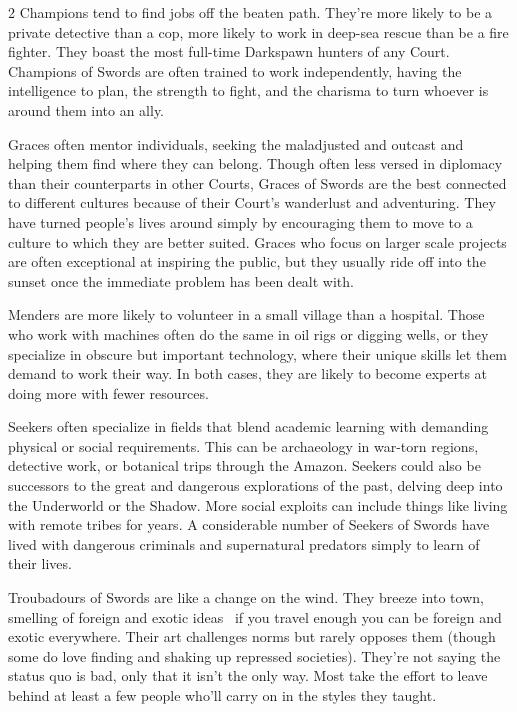 \begin{multicols}{2}
Champions tend to find jobs off the beaten path. They're more likely to be a private detective than a cop, more likely to work in deep-sea rescue than be a fire fighter. They boast the most full-time Darkspawn hunters of any Court. Champions of Swords are often trained to work independently, having the intelligence to plan, the strength to fight, and the charisma to turn whoever is around them into an ally.

Graces often mentor individuals, seeking the maladjusted and outcast and helping them find where they can belong. Though often less versed in diplomacy than their counterparts in other Courts, Graces of Swords are the best connected to different cultures because of their Court's wanderlust and adventuring. They have turned people's lives around simply by encouraging them to move to a culture to which they are better suited. Graces who focus on larger scale projects are often exceptional at inspiring the public, but they usually ride off into the sunset once the immediate problem has been dealt with.

Menders are more likely to volunteer in a small village than a hospital. Those who work with machines often do the same in oil rigs or digging wells, or they specialize in obscure but important technology, where their unique skills let them demand to work their way. In both cases, they are likely to become experts at doing more with fewer resources.

Seekers often specialize in fields that blend academic learning with demanding physical or social requirements. This can be archaeology in war-torn regions, detective work, or botanical trips through the Amazon. Seekers could also be successors to the great and dangerous explorations of the past, delving deep into the Underworld or the Shadow. More social exploits can include things like living with remote tribes for years. A considerable number of Seekers of Swords have lived with dangerous criminals and supernatural predators simply to learn of their lives.

Troubadours of Swords are like a change on the wind. They breeze into town, smelling of foreign and exotic ideas \textendash\, if you travel enough you can be foreign and exotic everywhere. Their art challenges norms but rarely opposes them (though some do love finding and shaking up repressed societies). They're not saying the status quo is bad, only that it isn't the only way. Most take the effort to leave behind at least a few people who'll carry on in the styles they taught. 


\end{multicols}
